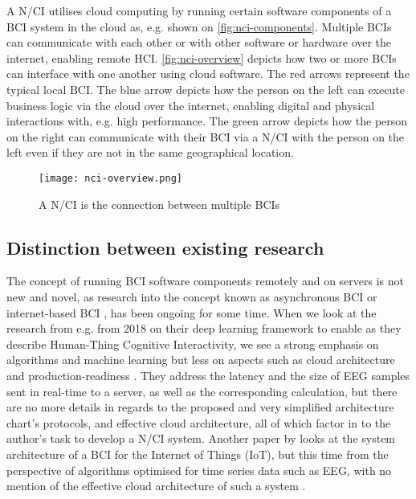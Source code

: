 A N/CI utilises cloud computing by running certain software components of a BCI system in the cloud as, e.g. shown on \autoref{fig:nci-components}. Multiple BCIs can communicate with each other or with other software or hardware over the internet, enabling remote HCI. \autoref{fig:nci-overview} depicts how two or more BCIs can interface with one another using cloud software. The red arrows represent the typical local BCI. The blue arrow depicts how the person on the left can execute business logic via the cloud over the internet, enabling digital and physical interactions with, e.g. high performance. The green arrow depicts how the person on the right can communicate with their BCI via a N/CI with the person on the left even if they are not in the same geographical location.

\begin{figure}[ht]
  \centering
  \texttt{[image: nci-overview.png]}
  \caption{A N/CI is the connection between multiple BCIs}
  \label{fig:nci-overview}
\end{figure}

\subsection{Distinction between existing research}
\label{chapter2-distinction-between-existing-research}

The concept of running BCI software components remotely and on servers is not new and novel, as research into the concept known as asynchronous BCI \citep{an_design_2016} or internet-based BCI \citep{lampe_brain-computer_2014}, has been ongoing for some time. When we look at the research from e.g. \citeauthor{zhang_internet_2018} from 2018 on their deep learning framework to enable as they describe Human-Thing Cognitive Interactivity, we see a strong emphasis on algorithms and machine learning but less on aspects such as cloud architecture and production-readiness \citep{zhang_internet_2018}. They address the latency and the size of EEG samples sent in real-time to a server, as well as the corresponding calculation, but there are no more details in regards to the proposed and very simplified architecture chart's protocols, and effective cloud architecture, all of which factor in to the author's task to develop a N/CI system. Another paper by \citeauthor{ahamad_system_2022} looks at the system architecture of a BCI for the Internet of Things (IoT), but this time from the perspective of algorithms optimised for time series data such as EEG, with no mention of the effective cloud architecture of such a system \citep{ahamad_system_2022}.

